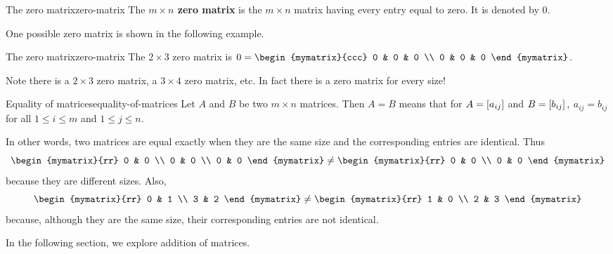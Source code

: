 \begin{definition}{The zero matrix}{zero-matrix}
The \textbf{$m\times n$ zero matrix} is the $m\times n$ matrix
having every entry equal to zero. It is denoted by $0.$
\end{definition}

One possible zero matrix is shown in the following example.

\begin{example}{The zero matrix}{zero-matrix}
The $2\times 3$ zero matrix is $0= \begin{mymatrix}{ccc}
0 & 0 & 0 \\
0 & 0 & 0
\end{mymatrix} $.
\end{example}

Note there is a $2\times 3$ zero matrix, a $3\times 4$ zero matrix, etc. In
fact there is a zero matrix for every size! 

\begin{definition}{Equality of matrices}{equality-of-matrices}
 Let $A$ and $B$ be two $m \times n$ matrices. Then $A=B$ means
that for $A=\left[a_{ij}\right] $
and $B=\left[b_{ij}\right] ,$ $a_{ij}=b_{ij}$ for all $1\leq i\leq m$ and 
$1\leq j\leq n.$
\end{definition}

In other words, two matrices are equal exactly when they are the same size and the
corresponding entries are identical. Thus
\begin{equation*}
\begin{mymatrix}{rr}
0 & 0 \\
0 & 0 \\
0 & 0
\end{mymatrix} \neq \begin{mymatrix}{rr}
0 & 0 \\
0 & 0
\end{mymatrix}
\end{equation*}
because they are different sizes. 
Also,
\begin{equation*}
\begin{mymatrix}{rr}
0 & 1 \\
3 & 2 
\end{mymatrix} \neq \begin{mymatrix}{rr}
1 & 0 \\
2 & 3
\end{mymatrix}
\end{equation*}
because, although they are the same size, their corresponding entries are not identical.

In the following section, we explore addition of matrices. 
